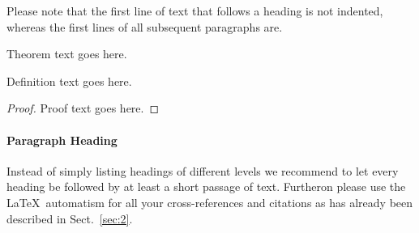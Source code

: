 Please note that the first line of text that follows a heading is not indented, whereas the first lines of all subsequent paragraphs are.

\begin{theorem}
Theorem text goes here.
\end{theorem}
%
%
\begin{definition}
Definition text goes here.
\end{definition}

\begin{proof}
Proof text goes here.
\end{proof}

\paragraph{Paragraph Heading} %
Instead of simply listing headings of different levels we recommend to let every heading be followed by at least a short passage of text. Furtheron please use the \LaTeX\ automatism for all your cross-references and citations as has already been described in Sect.~\ref{sec:2}.

